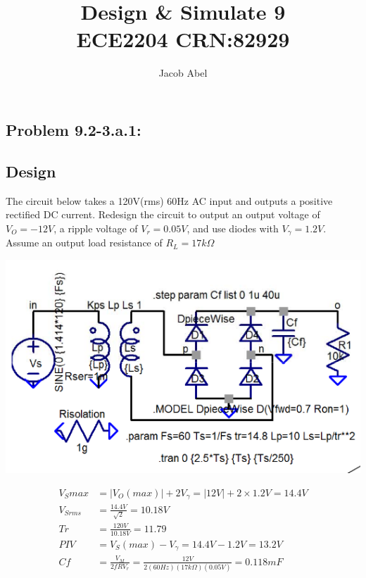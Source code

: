\documentclass[12pt,letterpaper,titlepage]{article}
\author{Jacob Abel}
\title{	Design \& Simulate 9
	\\\large ECE2204 CRN:82929
}
\begin{document}
\maketitle
\begin{raggedright}

\section{Problem 9.2-3.a.1: } 
\subsection{Design}

The circuit below takes a 120V(rms) 60Hz AC input and outputs a positive rectified DC current. Redesign the circuit to output an output voltage of $V_O = -12V$, a ripple voltage of $V_r = 0.05V$, and use diodes with $V_\gamma=1.2V$. Assume an output load resistance of $R_L = 17k\Omega$

\begin{center}
\includegraphics[width=\textwidth, height=12\baselineskip, keepaspectratio=true]{ds1}
\end{center}

\begin{align*}
    V_S{max} 
      &= |V_O(max)| + 2V_\gamma
       = |12V| + 2 \times 1.2V
       = 14.4V
\\  V_{Srms}
	  &= \frac{14.4V}{\sqrt{2}}
	   = 10.18V
\\  Tr
	  &= \frac{120V}{10.18V}
	   = 11.79
\\  PIV
	  &= V_S(max) - V_\gamma 
	   = 14.4V - 1.2V
	   = 13.2V
\\  Cf
      &= \frac{V_M}{2fRV_r}
       = \frac{12V}{2(60Hz)(17k\Omega)(0.05V)}
       = 0.118mF
\end{align*}


\end{raggedright}
\end{document}
